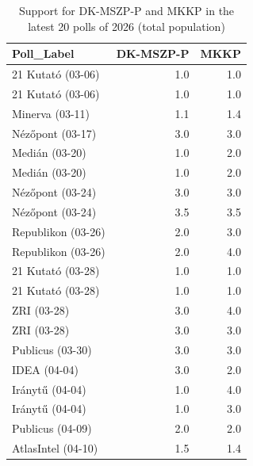 \begin{table}
\caption{Support for DK-MSZP-P and MKKP in the latest 20 polls of 2026 (total population)}
\label{tab:smaller_parties_polls_2026}
\begin{tabular}{lrr}
\toprule
Poll_Label & DK-MSZP-P & MKKP \\
\midrule
21 Kutató (03-06) & 1.0 & 1.0 \\
21 Kutató (03-06) & 1.0 & 1.0 \\
Minerva (03-11) & 1.1 & 1.4 \\
Nézőpont (03-17) & 3.0 & 3.0 \\
Medián (03-20) & 1.0 & 2.0 \\
Medián (03-20) & 1.0 & 2.0 \\
Nézőpont (03-24) & 3.0 & 3.0 \\
Nézőpont (03-24) & 3.5 & 3.5 \\
Republikon (03-26) & 2.0 & 3.0 \\
Republikon (03-26) & 2.0 & 4.0 \\
21 Kutató (03-28) & 1.0 & 1.0 \\
21 Kutató (03-28) & 1.0 & 1.0 \\
ZRI (03-28) & 3.0 & 4.0 \\
ZRI (03-28) & 3.0 & 3.0 \\
Publicus (03-30) & 3.0 & 3.0 \\
IDEA (04-04) & 3.0 & 2.0 \\
Iránytű (04-04) & 1.0 & 4.0 \\
Iránytű (04-04) & 1.0 & 3.0 \\
Publicus (04-09) & 2.0 & 2.0 \\
AtlasIntel (04-10) & 1.5 & 1.4 \\
\bottomrule
\end{tabular}
\end{table}
